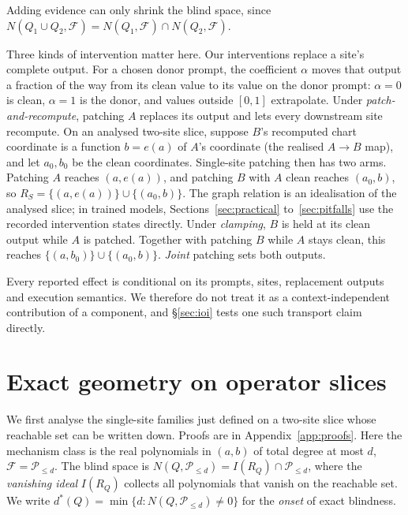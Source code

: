 \documentclass{article}
\theoremstyle{plain}
\theoremstyle{definition}
\begin{document}
Adding evidence can only shrink the blind space, since $N(Q_1\cup Q_2,\mathcal F)=N(Q_1,\mathcal F)\cap
N(Q_2,\mathcal F)$.

Three kinds of intervention matter here. Our interventions replace a site's complete output. For a chosen donor prompt, the coefficient $\alpha$
moves that output a fraction of the way from its clean value to its value on the donor prompt: $\alpha=0$
is clean, $\alpha=1$ is the donor, and values outside $[0,1]$ extrapolate. Under \emph{patch-and-recompute}, patching
$A$ replaces its output and lets every downstream site recompute. On an analysed two-site slice, suppose $B$'s
recomputed chart coordinate is a function $b=e(a)$ of $A$'s coordinate (the realised $A\to B$ map), and let
$a_0,b_0$ be the clean coordinates. Single-site patching then has two arms. Patching $A$ reaches $(a,e(a))$, and
patching $B$ with $A$ clean reaches $(a_0,b)$, so $R_S=\{(a,e(a))\}\cup\{(a_0,b)\}$. The graph relation is an
idealisation of the analysed slice; in trained models, Sections~\ref{sec:practical} to~\ref{sec:pitfalls} use the
recorded intervention states directly. Under \emph{clamping}, $B$ is held at its clean output while $A$ is patched.
Together with patching $B$ while $A$ stays clean, this reaches $\{(a,b_0)\}\cup\{(a_0,b)\}$. \emph{Joint} patching sets
both outputs.

Every reported effect is conditional on its prompts, sites, replacement outputs and execution semantics. We therefore
do not treat it as a context-independent contribution of a component, and \S\ref{sec:ioi} tests one such transport
claim directly.

\section{Exact geometry on operator slices}
\label{sec:theory}

We first analyse the single-site families just defined on a two-site slice whose reachable set can be written down. Proofs are in
Appendix~\ref{app:proofs}. Here the mechanism class is the real polynomials in $(a,b)$ of total degree at most $d$,
$\mathcal F=\mathcal P_{\le d}$. The blind space is $N(Q,\mathcal P_{\le d})=I(R_Q)\cap\mathcal P_{\le d}$, where the
\emph{vanishing ideal} $I(R_Q)$ collects all polynomials that vanish on the reachable set. We write
$d^*(Q)=\min\{d:N(Q,\mathcal P_{\le d})\neq0\}$ for the \emph{onset} of exact blindness.
\end{document}
